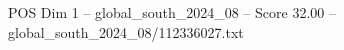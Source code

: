 \begin{textsample}{POS Dim 1 – global\_south\_2024\_08 – Score 32.00 – global\_south\_2024\_08/112336027.txt}
\end{textsample}
